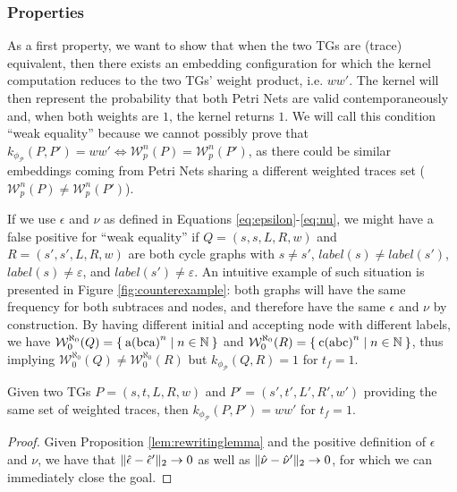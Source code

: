 \subsubsection{Properties}
As a first property, we want to show that when the two TGs are (trace) equivalent, then there exists an embedding configuration for which the kernel computation reduces to the two TGs' weight product, i.e. $ww'$. The kernel will then represent the probability that both Petri Nets are valid contemporaneously and, when both weights are $1$, the kernel returns $1$. We will call this condition  ``weak equality'' because we cannot possibly prove that $k_{\phi_{\mathcal{P}}}(P,P')=ww'\Leftrightarrow \mathcal{W}_p^n(P)=\mathcal{W}_p^n(P')$, as there could be similar embeddings coming from Petri Nets sharing a different weighted traces set ($\mathcal{W}_p^n(P)\neq\mathcal{W}_p^n(P')$).

\begin{example}
	If we use $\epsilon$ and $\nu$ as defined in Equations \ref{eq:epsilon}-\ref{eq:nu}, we might have a false positive for ``weak equality'' if $Q=(s,s,L,R,w)$ and $R=(s',s',L,R,w)$ are both cycle graphs with $s\neq s'$, $\textit{label}(s)\neq\textit{label}(s')$, $\textit{label}(s)\neq\varepsilon$, and $\textit{label}(s')\neq\varepsilon$. An intuitive example of such situation is presented in Figure \ref{fig:counterexample}: both graphs will have the same frequency for both subtraces and nodes, and therefore have the same  $\epsilon$ and $\nu$ by construction. By having different initial and accepting node with  different labels, we have $\mathcal{W}_0^{\aleph_0}(Q)=\Set{\textup{a(bca)}^n|n\in\mathbb{N}}$ and $\mathcal{W}_0^{\aleph_0}(R)=\Set{\textup{c(abc)}^n|n\in\mathbb{N}}$, thus implying $\mathcal{W}_0^{\aleph_0}(Q)\neq\mathcal{W}_0^{\aleph_0}(R)$ but $k_{\phi_{\mathcal{P}}}(Q,R)=1$ for $t_f=1$.
\end{example}


\begin{lemma}
	Given two TGs $P=(s,t,L,R,w)$ and $P'=(s',t',L',R',w')$ providing the same set of weighted traces, then $k_{\phi_{\mathcal{P}}}(P,P')=ww'$ for $t_f=1$.
\end{lemma}
\begin{proof}
	Given Proposition \ref{lem:rewritinglemma} and the positive definition of $\epsilon$ and $\nu$,  we have that $\|\hat{\epsilon}-\hat{\epsilon}'\|_{2}\to 0$ as well as $\|\hat{\nu}-\hat{\nu}'\|_{2}\to 0$, for which we can immediately close the goal.
\end{proof}

